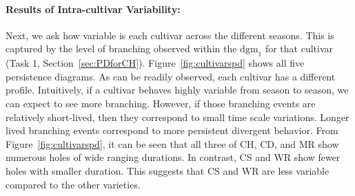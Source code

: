 \begin{table}[htb]
\centering
{}
\caption{Pairwise distance matrix for cultivars. For each cultivar data from 1999-2022 was used. Each value shows the Wasserstein distance between the $\mathrm{dgm}_1$ obtained for the corresponding two cultivars.
}
\label{tab:distance_matrix_cultivars}
\end{table}

\vspace*{-0.2in}
\paragraph{Results of Intra-cultivar Variability:}
\label{sec:results:intracultivar}
Next, we ask how variable is each cultivar across the different seasons. This is captured by the level of branching observed within the $\mathrm{dgm}_1$ for that cultivar (Task 1, Section~\ref{sec:PDforCH}).
Figure~\ref{fig:cultivarspd}
shows all five persistence diagrams. As can be readily observed, each cultivar has a different profile. 
Intuitively, if a cultivar behaves highly variable from season to season, we can expect to see more branching. However, if those branching events are relatively short-lived, then they correspond to small time scale variations. Longer lived branching events correspond to more persistent divergent behavior. 
From Figure~\ref{fig:cultivarspd}, it can be seen that all three of CH, CD, and MR show numerous holes of wide ranging durations. In contrast, CS and WR show fewer holes with smaller duration. This suggests that CS and WR are less variable compared to the other varieties.



